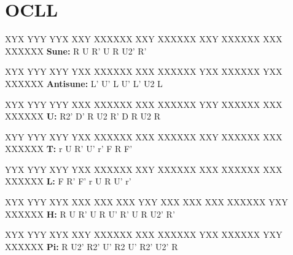 \section{OCLL}

\begin{multicols}{2}

\RubikCubeGreyAll
\RubikFaceUp XYX YYY YYX
\RubikFaceFront XXY XXXXXX
\RubikFaceRight XXY XXXXXX
\RubikFaceBack XXY XXXXXX
\RubikFaceLeft XXX XXXXXX
\hspace{0.45cm}\textbf{Sune:} R U R' U R U2' R'
\vspace{0.45cm}

\RubikCubeGreyAll
\RubikFaceUp XYX YYY XYY
\RubikFaceFront YXX XXXXXX
\RubikFaceRight XXX XXXXXX
\RubikFaceBack YXX XXXXXX
\RubikFaceLeft YXX XXXXXX
\hspace{0.45cm}\textbf{Antisune:} L' U' L U' L' U2 L
\vspace{0.45cm}

\RubikCubeGreyAll
\RubikFaceUp XYX YYY YYY
\RubikFaceFront XXX XXXXXX
\RubikFaceRight XXX XXXXXX
\RubikFaceBack YXY XXXXXX
\RubikFaceLeft XXX XXXXXX
\hspace{0.45cm}\textbf{U:} R2' D' R U2 R' D R U2 R
\vspace{0.45cm}

\RubikCubeGreyAll
\RubikFaceUp XYY YYY XYY
\RubikFaceFront YXX XXXXXX
\RubikFaceRight XXX XXXXXX
\RubikFaceBack XXY XXXXXX
\RubikFaceLeft XXX XXXXXX
\hspace{0.45cm}\textbf{T:} r U R' U' r' F R F'
\vspace{0.45cm}

\RubikCubeGreyAll
\RubikFaceUp YYX YYY XYY
\RubikFaceFront YXX XXXXXX
\RubikFaceRight XXY XXXXXX
\RubikFaceBack XXX XXXXXX
\RubikFaceLeft XXX XXXXXX
\hspace{0.45cm}\textbf{L:} F R' F' r U R U' r'
\vspace{0.45cm}

\RubikCubeGreyAll
\RubikFaceUp XYX YYY XYX
\RubikFaceFront XXX XXX XXX
\RubikFaceRight YXY XXX XXX
\RubikFaceBack XXX XXXXXX
\RubikFaceLeft YXY XXXXXX
\hspace{0.45cm}\textbf{H:} R U R' U R U' R' U R U2' R'
\vspace{0.45cm}

\RubikCubeGreyAll
\RubikFaceUp XYX YYY XYX
\RubikFaceFront XXY XXXXXX
\RubikFaceRight XXX XXXXXX
\RubikFaceBack YXX XXXXXX
\RubikFaceLeft YXY XXXXXX
\hspace{0.45cm}\textbf{Pi:} R U2' R2' U' R2 U' R2' U2' R

\end{multicols}

